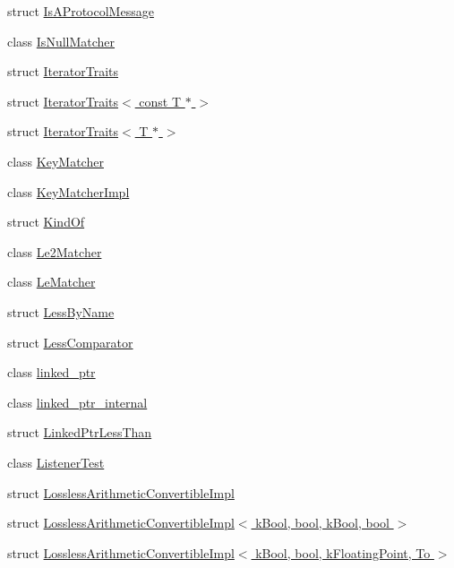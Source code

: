\begin{DoxyCompactItemize}
struct \hyperlink{structtesting_1_1internal_1_1IsAProtocolMessage}{Is\+A\+Protocol\+Message}
\item 
class \hyperlink{classtesting_1_1internal_1_1IsNullMatcher}{Is\+Null\+Matcher}
\item 
struct \hyperlink{structtesting_1_1internal_1_1IteratorTraits}{Iterator\+Traits}
\item 
struct \hyperlink{structtesting_1_1internal_1_1IteratorTraits_3_01const_01T_01_5_01_4}{Iterator\+Traits$<$ const T $\ast$ $>$}
\item 
struct \hyperlink{structtesting_1_1internal_1_1IteratorTraits_3_01T_01_5_01_4}{Iterator\+Traits$<$ T $\ast$ $>$}
\item 
class \hyperlink{classtesting_1_1internal_1_1KeyMatcher}{Key\+Matcher}
\item 
class \hyperlink{classtesting_1_1internal_1_1KeyMatcherImpl}{Key\+Matcher\+Impl}
\item 
struct \hyperlink{structtesting_1_1internal_1_1KindOf}{Kind\+Of}
\item 
class \hyperlink{classtesting_1_1internal_1_1Le2Matcher}{Le2\+Matcher}
\item 
class \hyperlink{classtesting_1_1internal_1_1LeMatcher}{Le\+Matcher}
\item 
struct \hyperlink{structtesting_1_1internal_1_1LessByName}{Less\+By\+Name}
\item 
struct \hyperlink{structtesting_1_1internal_1_1LessComparator}{Less\+Comparator}
\item 
class \hyperlink{classtesting_1_1internal_1_1linked__ptr}{linked\+\_\+ptr}
\item 
class \hyperlink{classtesting_1_1internal_1_1linked__ptr__internal}{linked\+\_\+ptr\+\_\+internal}
\item 
struct \hyperlink{structtesting_1_1internal_1_1LinkedPtrLessThan}{Linked\+Ptr\+Less\+Than}
\item 
class \hyperlink{classtesting_1_1internal_1_1ListenerTest}{Listener\+Test}
\item 
struct \hyperlink{structtesting_1_1internal_1_1LosslessArithmeticConvertibleImpl}{Lossless\+Arithmetic\+Convertible\+Impl}
\item 
struct \hyperlink{structtesting_1_1internal_1_1LosslessArithmeticConvertibleImpl_3_01kBool_00_01bool_00_01kBool_00_01bool_01_4}{Lossless\+Arithmetic\+Convertible\+Impl$<$ k\+Bool, bool, k\+Bool, bool $>$}
\item 
struct \hyperlink{structtesting_1_1internal_1_1LosslessArithmeticConvertibleImpl_3_01kBool_00_01bool_00_01kFloatingPoint_00_01To_01_4}{Lossless\+Arithmetic\+Convertible\+Impl$<$ k\+Bool, bool, k\+Floating\+Point, To $>$}

\end{DoxyCompactItemize}
